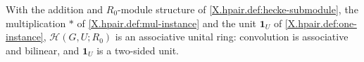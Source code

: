 With the addition and $R_0$-module structure of \cref{X.hpair.def:hecke-submodule}, the multiplication $*$ of \cref{X.hpair.def:mul-instance} and the unit $\mathbf 1_U$ of \cref{X.hpair.def:one-instance}, $\mathcal H(G,U;R_0)$ is an associative unital ring: convolution is associative and bilinear, and $\mathbf 1_U$ is a two-sided unit.

